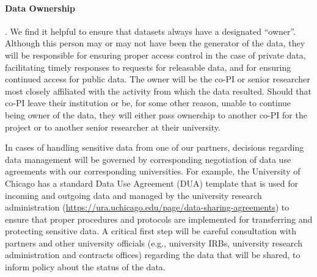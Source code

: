 \paragraph{Data Ownership}. We find it helpful to ensure that datasets
always have a designated ``owner''. Although this person may or may
not have been the generator of the data, they will be responsible for
ensuring proper access control in the case of private data, facilitating
timely responses to requests for releasable data, and for ensuring
continued access for public
data. The owner will be the co-PI or senior researcher most closely
affiliated with the activity from which the data resulted. Should that
co-PI leave their institution or be, for some other reason, unable to
continue being owner of the data, they will either pass ownership to
another co-PI for the project or to another senior researcher at their
university.

In cases of handling sensitive data from one of our partners, decisions
regarding data management will be governed by corresponding negotiation
of data use agreements with our corresponding universities. For example,
the University of Chicago has a standard Data Use Agreement (DUA)
template that is used for incoming and outgoing data and managed by the
university research administration
(\url{https://ura.uchicago.edu/page/data-sharing-agreements})
to ensure that proper procedures and protocols are implemented for
transferring and protecting sensitive data. A critical first step will
be careful consultation with partners and other university officials
(e.g., university IRBs, university research administration and contracts
offices) regarding the data that will be shared, to inform policy about
the status of the data.

